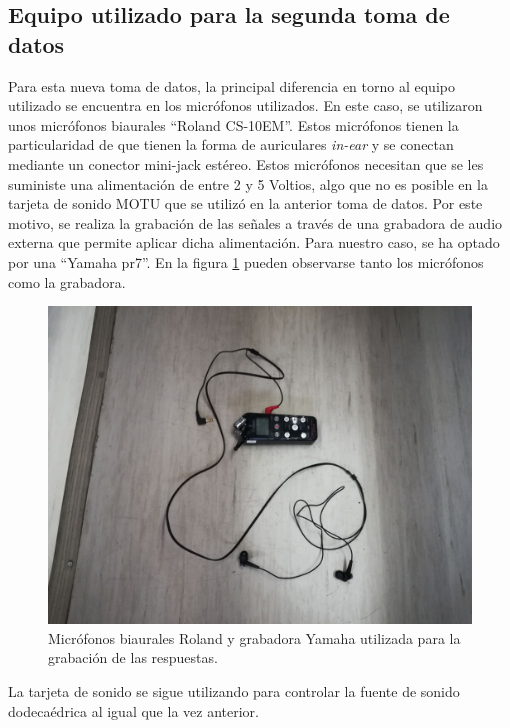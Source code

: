 \documentclass[11pt,a4paper,twoside]{book}
\begin{document}
        \subsection{Equipo utilizado para la segunda toma de datos}
            Para esta nueva toma de datos, la principal diferencia en torno al equipo utilizado se encuentra en los micrófonos utilizados. En este caso, se utilizaron unos micrófonos biaurales ``Roland CS-10EM''. Estos micrófonos tienen la particularidad de que tienen la forma de auriculares \textit{in-ear} y se conectan mediante un conector mini-jack estéreo. Estos micrófonos necesitan que se les suministe una alimentación de entre 2 y 5 Voltios, algo que no es posible en la tarjeta de sonido MOTU que se utilizó en la anterior toma de datos. Por este motivo, se realiza la grabación de las señales a través de una grabadora de audio externa que permite aplicar dicha alimentación. Para nuestro caso, se ha optado por una ``Yamaha pr7''. En la figura \ref{fig:microsBi} pueden observarse tanto los micrófonos como la grabadora.
                
            \begin{figure}
                \includegraphics[scale=0.3]{../imagenes/MicroBi.jpg}
                \centering
                \caption{Micrófonos biaurales Roland y grabadora Yamaha utilizada para la grabación de las respuestas.}
                \label{fig:microsBi}
            \end{figure}
                
            La tarjeta de sonido se sigue utilizando para controlar la fuente de sonido dodecaédrica al igual que la vez anterior.
                
\end{document}
